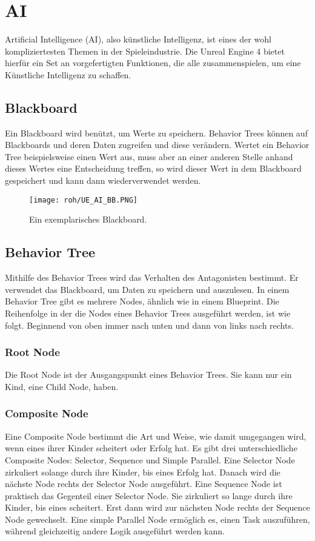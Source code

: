 \section{AI}
Artificial Intelligence (AI), also künstliche Intelligenz, ist eines der wohl kompliziertesten Themen in der Spieleindustrie.
Die Unreal Engine 4 bietet hierfür ein Set an vorgefertigten Funktionen, die alle zusammenspielen, um eine Künstliche Intelligenz zu schaffen.
\subsection{Blackboard}
Ein Blackboard wird benützt, um Werte zu speichern.\citep{ue:AIBB}
Behavior Trees können auf Blackboards und deren Daten zugreifen und diese verändern.
Wertet ein Behavior Tree beispielsweise einen Wert aus, muss aber an einer anderen Stelle anhand dieses Wertes eine Entscheidung treffen, so wird dieser Wert in dem Blackboard gespeichert und kann dann wiederverwendet werden.
\begin{figure}[H]
    \centering
    \texttt{[image: roh/UE\_AI\_BB.PNG]}
    \caption{Ein exemplarisches Blackboard.}
    \label{UE:AI_BB}
\end{figure}
\subsection{Behavior Tree}
Mithilfe des Behavior Trees wird das Verhalten des Antagonisten bestimmt.\citep{ue:AIBB}
Er verwendet das Blackboard, um Daten zu speichern und auszulesen.
In einem Behavior Tree gibt es mehrere Nodes, ähnlich wie in einem Blueprint.
Die Reihenfolge in der die Nodes eines Behavior Trees ausgeführt werden, ist wie folgt.
Beginnend von oben immer nach unten und dann von links nach rechts.\citep{ue:AIBTNodes}
\subsubsection{Root Node}
Die Root Node ist der Ausgangspunkt eines Behavior Trees.
Sie kann nur ein Kind, eine Child Node, haben.
\subsubsection{Composite Node}
Eine Composite Node bestimmt die Art und Weise, wie damit umgegangen wird, wenn eines ihrer Kinder scheitert oder Erfolg hat.
Es gibt drei unterschiedliche Composite Nodes:
Selector, Sequence und Simple Parallel.
Eine Selector Node zirkuliert solange durch ihre Kinder, bis eines Erfolg hat.
Danach wird die nächste Node rechts der Selector Node ausgeführt.
Eine Sequence Node ist praktisch das Gegenteil einer Selector Node.
Sie zirkuliert so lange durch ihre Kinder, bis eines scheitert.
Erst dann wird zur nächsten Node rechts der Sequence Node gewechselt.
Eine simple Parallel Node ermöglich es, einen Task auszuführen, während gleichzeitig andere Logik ausgeführt werden kann.
